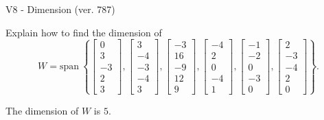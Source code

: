 \begin{exercise}
  \begin{exerciseTitle}V8 - Dimension (ver. 787)\end{exerciseTitle}
  \begin{exerciseStatement}
    Explain how to find the dimension of 
\[W=\mathrm{span}\ \left\{\left[\begin{array}{r}
0 \\
3 \\
-3 \\
2 \\
3
\end{array}\right] , \left[\begin{array}{r}
3 \\
-4 \\
-3 \\
-4 \\
3
\end{array}\right] , \left[\begin{array}{r}
-3 \\
16 \\
-9 \\
12 \\
9
\end{array}\right] , \left[\begin{array}{r}
-4 \\
2 \\
0 \\
-4 \\
1
\end{array}\right] , \left[\begin{array}{r}
-1 \\
-2 \\
0 \\
-3 \\
0
\end{array}\right] , \left[\begin{array}{r}
2 \\
-3 \\
-4 \\
2 \\
0
\end{array}\right]\right\}.\]



  \end{exerciseStatement}
  \begin{exerciseAnswer}
   The dimension of \(W\) is  \(5\).
  


  \end{exerciseAnswer}
\end{exercise}